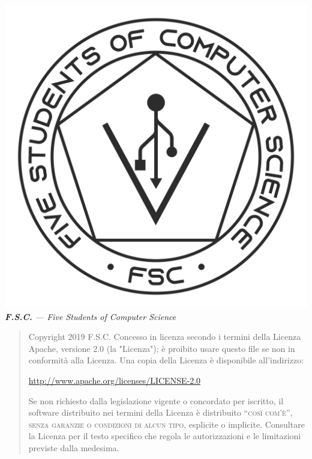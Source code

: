 \begin{titlepage}
		\clearpage
		\vspace*{\fill}
		\includegraphics[height=0.4\textwidth]{Logo_FSC_WhiteBg}\\[0.5cm]
		\textit{\textbf{F.S.C.} --- Five Students of Computer Science}
		
		\vspace*{5cm}
		
		\begin{flushleft}
			\begin{minipage}{\textwidth}%
				\begin{quote}
					\scriptsize Copyright \textcopyright{} 2019 F.S.C.
					\vskip15pt
					Concesso in licenza secondo i termini della Licenza Apache, versione 2.0 (la "Licenza"); è proibito usare questo file se non in conformità alla Licenza. Una copia della Licenza è disponibile all'indirizzo:
					\vskip5pt
					\begin{center}
						\url{http://www.apache.org/licenses/LICENSE-2.0}
					\end{center}
					\vskip5pt
					Se non richiesto dalla legislazione vigente o concordato per iscritto, il software distribuito nei termini della Licenza è distribuito ``\textsc{così com'è}'', \textsc{senza garanzie o condizioni di alcun tipo}, esplicite o implicite. Consultare la Licenza per il testo specifico che regola le autorizzazioni e le limitazioni previste dalla medesima.
				\end{quote}
			\end{minipage}
		\end{flushleft}

		\vspace*{\fill}
		
	\end{titlepage}
